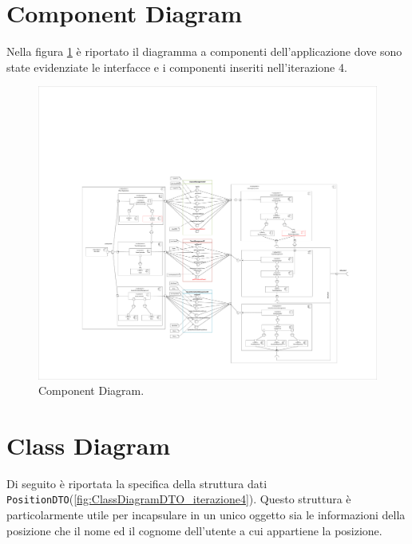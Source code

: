 \section{Component Diagram}
Nella figura \ref{fig:ComponentDiagram_iterazione3} è riportato il diagramma a componenti dell'applicazione dove sono state evidenziate le interfacce e i componenti inseriti nell'iterazione 4. 
\begin{figure}[h!]
	\centering
	\includegraphics[width=1\linewidth]{./Iterazione 4/OtherFiles/UML - Component view V2}
	\caption{Component Diagram.}
	\label{fig:ComponentDiagram_iterazione3}
\end{figure}

\clearpage
\section{Class Diagram}
Di seguito è riportata la specifica della struttura dati \texttt{PositionDTO}(\Fig\ref{fig:ClassDiagramDTO_iterazione4}). Questo struttura è particolarmente utile per incapsulare in un unico oggetto sia le informazioni della posizione che il nome ed il cognome dell'utente a cui appartiene la posizione.

